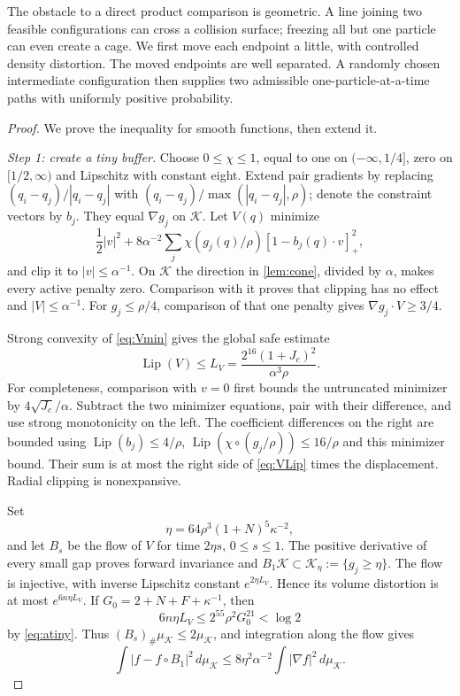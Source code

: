 \documentclass[11pt]{article}
\numberwithin{equation}{section}
\theoremstyle{definition}
\theoremstyle{remark}\newtheorem{remark}[theorem]{Remark}
\newcommand{\Lip}{\operatorname{Lip}}
\newcommand{\K}{\mathcal K}
\newcommand{\dd}{\,d}
\begin{document}
The obstacle to a direct product comparison is geometric. A line joining
two feasible configurations can cross a collision surface; freezing all but
one particle can even create a cage. We first move each endpoint a little,
with controlled density distortion. The moved endpoints are well separated.
A randomly chosen intermediate configuration then supplies two admissible
one-particle-at-a-time paths with uniformly positive probability.

\begin{proof}
We prove the inequality for smooth functions, then extend it.

\emph{Step 1: create a tiny buffer.}
Choose $0\le\chi\le1$, equal to one on $(-\infty,1/4]$, zero on
$[1/2,\infty)$ and Lipschitz with constant eight. Extend pair gradients
by replacing $(q_i-q_j)/|q_i-q_j|$ with
$(q_i-q_j)/\max(|q_i-q_j|,\rho)$; denote the constraint vectors by $b_j$.
They equal $\nabla g_j$ on $\K$. Let $V(q)$ minimize
\begin{equation}\label{eq:Vmin}
 \frac12|v|^2+8\alpha^{-2}\sum_j
 \chi(g_j(q)/\rho)[1-b_j(q)\cdot v]_+^2,
\end{equation}
and clip it to $|v|\le\alpha^{-1}$. On $\K$ the direction in
\cref{lem:cone}, divided by $\alpha$, makes every active penalty zero.
Comparison with it proves that clipping has no effect and $|V|\le\alpha^{-1}$.
For $g_j\le\rho/4$, comparison of that one penalty gives
$\nabla g_j\cdot V\ge3/4$.

Strong convexity of \eqref{eq:Vmin} gives the global safe estimate
\begin{equation}\label{eq:VLip}
 \Lip(V)\le L_V=\frac{2^{16}(1+J_c)^2}{\alpha^3\rho}.
\end{equation}
For completeness, comparison with $v=0$ first bounds the untruncated
minimizer by $4\sqrt{J_c}/\alpha$. Subtract the two minimizer equations,
pair with their difference, and use strong monotonicity on the left.
The coefficient differences on the right are bounded using
$\Lip(b_j)\le4/\rho$, $\Lip(\chi\circ(g_j/\rho))\le16/\rho$
and this minimizer bound. Their sum is at most the right side of
\eqref{eq:VLip} times the displacement. Radial clipping is nonexpansive.

Set
\begin{equation}\label{eq:buffereta}
 \eta=64\rho^3(1+N)^5\kappa^{-2},
\end{equation}
and let $B_s$ be the flow of $V$ for time $2\eta s$, $0\le s\le1$.
The positive derivative of every small gap proves forward invariance and
$B_1\K\subset\K_\eta:=\{g_j\ge\eta\}$. The flow is injective, with
inverse Lipschitz constant $e^{2\eta L_V}$. Hence its volume distortion is
at most $e^{6n\eta L_V}$. If $G_0=2+N+F+\kappa^{-1}$, then
\[
 6n\eta L_V\le2^{55}\rho^2G_0^{21}<\log2
\]
by \eqref{eq:atiny}. Thus $(B_s)_\#\mu_\K\le2\mu_\K$, and integration
along the flow gives
\begin{equation}\label{eq:bufferenergy}
 \int|f-f\circ B_1|^2\dd\mu_\K
 \le8\eta^2\alpha^{-2}\int|\nabla f|^2\dd\mu_\K.
\end{equation}


\end{proof}
\end{document}
